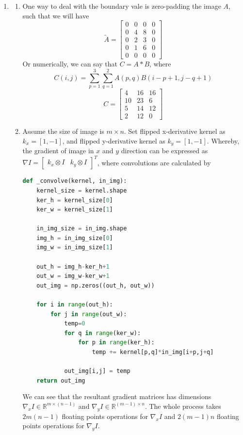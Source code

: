 \documentclass[12pt]{article}
\begin{document}
\begin{enumerate}
	\item \begin{enumerate}
		\item One way to deal with the boundary vale is zero-padding the image $A$, such that we will have 
		$$\tilde{A}=\begin{bmatrix}
		0 & 0 & 0 & 0\\ 0 & 4 & 8 & 0\\ 0 & 2 & 3 & 0\\ 0 & 1 & 6 & 0\\0 & 0 & 0 & 0
		\end{bmatrix}$$ 
		Or numerically, we can say that $C=A*B$, where 
		$$C(i,j)=\sum_{p=1}^{3}\sum_{q=1}^{2}A(p,q)B(i-p+1,j-q+1)$$
		$$C=\begin{bmatrix}
		4 & 16 & 16\\ 10& 23 & 6\\ 5 & 14 & 12\\ 2 & 12 & 0
		\end{bmatrix}$$
		
		\item Assume the size of image is $m\times n$. Set flipped x-derivative kernel as $k_x=[1,-1]$, and flipped y-derivative kernel as $k_y=[1,-1]$. Whereby, the gradient of image in $x$ and $y$ direction can be expressed as 
		$\nabla I=\begin{bmatrix}
		k_x\otimes I&k_y\otimes I
		\end{bmatrix}^T$, where convolutions are calculated by
\begin{lstlisting}[language=Python]
def _convolve(kernel, in_img):
	kernel_size = kernel.shape
	ker_h = kernel_size[0]
	ker_w = kernel_size[1]
	
	in_img_size = in_img.shape
	img_h = in_img_size[0]
	img_w = in_img_size[1]
	
	out_h = img_h-ker_h+1
	out_w = img_w-ker_w+1
	out_img = np.zeros((out_h, out_w))
	
	for i in range(out_h):
		for j in range(out_w):
			temp=0
			for q in range(ker_w):
				for p in range(ker_h):
					temp += kernel[p,q]*in_img[i+p,j+q]
			
			out_img[i,j] = temp
	return out_img
\end{lstlisting}

We can see that the resultant gradient matrices has dimensions $\nabla_x I\in\mathbb{R}^{m\times (n-1)}$ and $\nabla_y I\in\mathbb{R}^{(m-1)\times n}$. The whole process takes $2m(n-1)$ floating points operations for $\nabla_xI$ and $2(m-1)n$ floating points operations for $\nabla_yI$.\\


\end{enumerate}
\end{enumerate}
\end{document}
